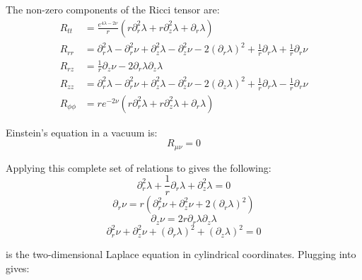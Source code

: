 \documentclass{article}
\begin{document}
The non-zero components of the Ricci tensor are:
\begin{equation}
\begin{aligned}
R_{tt}&=\frac{e^{4\lambda-2\nu}}{r}\left(r\partial^{2}_{r}\lambda+r\partial^{2}_{z}\lambda+\partial_{r}\lambda\right)\\
R_{rr}&=\partial^{2}_{r}\lambda-\partial^{2}_{r}\nu+\partial^{2}_{z}\lambda-\partial^{2}_{z}\nu-2\left(\partial_{r}\lambda\right)^{2}+\frac{1}{r}\partial_{r}\lambda+\frac{1}{r}\partial_{r}\nu\\
R_{rz}&=\frac{1}{r}\partial_{z}\nu-2\partial_{r}\lambda\partial_{z}\lambda\\
R_{zz}&=\partial^{2}_{r}\lambda-\partial^{2}_{r}\nu+\partial^{2}_{z}\lambda-\partial^{2}_{z}\nu-2\left(\partial_{z}\lambda\right)^{2}+\frac{1}{r}\partial_{r}\lambda-\frac{1}{r}\partial_{r}\nu\\
R_{\phi\phi}&=re^{-2\nu}\left(r\partial^{2}_{r}\lambda+r\partial^{2}_{z}\lambda+\partial_{r}\lambda\right)
\end{aligned}
\label{eq:ricci-tensor-components}
\end{equation}

Einstein's equation in a vacuum is:
\begin{equation}
R_{\mu\nu}=0\label{eq:vacuum-solutions}
\end{equation}

Applying this complete set of relations to  gives the following:
\begin{equation}
\partial^{2}_{r}\lambda+\frac{1}{r}\partial_{r}\lambda+\partial^{2}_{z}\lambda=0\label{eq:laplace}
\end{equation}
\begin{equation}
\partial_{r}\nu=r\left(\partial^{2}_{r}\nu+\partial^{2}_{z}\nu+2\left(\partial_{r}\lambda\right)^{2}\right)\label{eq:R_rr=0}
\end{equation}
\begin{equation}
\partial_{z}\nu=2r\partial_{r}\lambda\partial_{z}\lambda\label{eq:nu_z}
\end{equation}
\begin{equation}
\partial^{2}_{r}\nu+\partial^{2}_{z}\nu+\left(\partial_{r}\lambda\right)^{2}+\left(\partial_{z}\lambda\right)^{2}=0\label{eq:R_phiphi=0}
\end{equation}

 is the two-dimensional Laplace equation in cylindrical coordinates. Plugging  into  gives:
\end{document}
